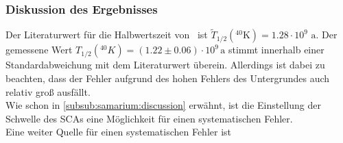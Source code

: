\subsubsection{Diskussion des Ergebnisses}
Der Literaturwert für die Halbwertszeit von \kalium\, ist $\tilde{T}_{1/2}({}^{40}\text{K}) = 1.28 \cdot 10^{9} \text{ a}$. Der gemessene Wert 
$T_{1/2} \left( {}^{40} K \right) = (1.22 \pm 0.06) \cdot 10^9\,\text{a}$ stimmt innerhalb einer Standardabweichung mit dem Literaturwert überein. 
Allerdings ist dabei zu beachten, dass der Fehler aufgrund des hohen Fehlers des Untergrundes auch relativ groß ausfällt. \\
Wie schon in \ref{subsub:samarium:discussion} erwähnt, ist die Einstellung der Schwelle des SCAs eine Möglichkeit für einen systematischen Fehler. \\
Eine weiter Quelle für einen systematischen Fehler ist 